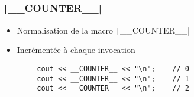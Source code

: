 \documentclass[C++.tex]{subfiles}
\begin{document}
\begin{frame}[fragile]
	\frametitle{\texttt|__COUNTER__|}
	\begin{itemize}
		\item Normalisation de la macro \texttt|__COUNTER__|
		\item Incrémentée à chaque invocation
	\end{itemize}

	\begin{verbatim}
		cout << __COUNTER__ << "\n";	// 0
		cout << __COUNTER__ << "\n";	// 1
		cout << __COUNTER__ << "\n";	// 2
	\end{verbatim}


\end{frame}
\end{document}
